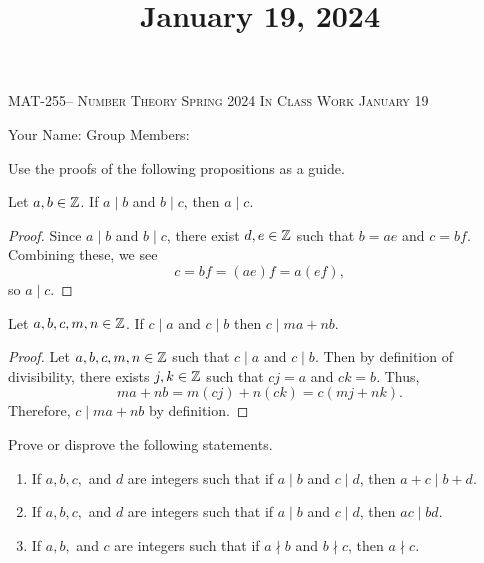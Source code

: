 \documentclass[handout]{ximera}
\title{January 19, 2024}
\begin{document}
\handoutAbstract
\maketitle
  \begin{center}%
    {\large \scshape MAT-255-- Number Theory \hfill Spring 2024 \hfill In Class Work January 19}%
    
    {\large
        Your Name: \hrulefill \quad 
        Group Members:\hrulefill \quad \hrulefill
        \par}%
  \end{center}%

Use the proofs of the following propositions as a guide.

\begin{proposition}%
    Let $a,b\in\mathbb Z$. If $a\mid b$ and $b \mid c$, then $a\mid c$.
    \begin{proof}
        Since $a\mid b$ and $b \mid c$, there exist $d,e\in\mathbb Z$ such that $b=ae$ and $c=bf$. Combining these, we see \[c=bf=(ae)f=a(ef),\] so $a\mid c$.
    \end{proof}
\end{proposition}



\begin{proposition}%
    Let $a,b,c,m,n\in\mathbb Z$.
    If $c\mid a$ and $c\mid b$ then $c\mid ma+nb$.

    \begin{proof}
        Let $a,b,c,m,n\in\mathbb Z$ such that $c\mid a$ and $c\mid b$. Then by definition of divisibility, there exists $j,k\in\mathbb Z$ such that $cj=a$ and $ck=b$. Thus, \[ma+nb=m(cj)+n(ck)=c(mj+nk).\] Therefore, $c\mid ma+nb$ by definition.
    \end{proof}
\end{proposition}

\begin{br}%
    Prove or disprove the following statements.
    \begin{enumerate}
        \item If $a,b,c,$ and $d$ are integers such that if $a\mid b$ and $c\mid d$, then $a+c\mid b+d$.
        \item If $a,b,c,$ and $d$ are integers such that if $a\mid b$ and $c\mid d$, then $ac\mid bd$.
        \item If $a,b,$ and $c$ are integers such that if $a\nmid b$ and $b\nmid c$, then $a\nmid c$.
    \end{enumerate}
\end{br}
\end{document}
